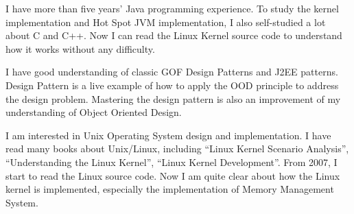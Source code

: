 
\par
I have more than five years' Java programming experience. To study the kernel
implementation and Hot Spot JVM implementation, I also self-studied a lot about 
C and C++. Now I can read the Linux Kernel source code to understand how it works
without any difficulty.

I have good understanding of classic GOF Design Patterns and J2EE patterns. 
Design Pattern is a live example of how to apply the OOD principle to address
the design problem. Mastering the design pattern is also an improvement of 
my understanding of Object Oriented Design.




\par
I am interested in Unix Operating System design and implementation. I have 
read many books about Unix/Linux, including ``Linux Kernel Scenario Analysis'', 
``Understanding the Linux Kernel'', ``Linux Kernel Development''. From 2007, 
I start to read the Linux source code. Now I am quite clear about how the Linux
kernel is implemented, especially the implementation of Memory Management System.







